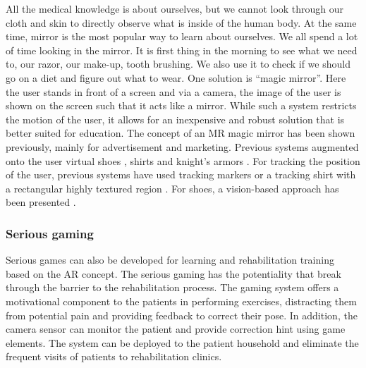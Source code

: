 All the medical knowledge is about ourselves, but we cannot look through our cloth and skin to directly observe what is inside of the human body.  At the same time, mirror is the most popular way to learn about ourselves. We all spend a lot of time looking in the mirror. It is first thing in the morning to see what we need to, our razor, our make-up, tooth brushing. We also use it to check if we should go on a diet and figure out what to wear. 
One solution is ``magic mirror''. Here the user stands in front of a screen and via a camera, the image of the user is shown on the screen such that it acts like a mirror. 
While such a system restricts the motion of the user, it allows for an inexpensive and robust solution that is better suited for education. The concept of an MR magic mirror has been shown previously, mainly for advertisement and marketing. Previous systems augmented onto the user virtual shoes \cite{Eisert2008,Luh2013} , shirts \cite{Ehara2006} and knight's armors \cite{Fiala2007}. For tracking the position of the user, previous systems have used tracking markers  or a tracking shirt with a rectangular highly textured region \cite{Hilsmann2008}. For shoes, a vision-based approach has been presented \cite{Eisert2008}.

\subsubsection{Serious gaming}
Serious games can also be developed for learning and rehabilitation training based on the AR concept.
The serious gaming has the potentiality that break through the barrier to the rehabilitation process. The gaming system offers a motivational component to the patients in performing exercises, distracting them from potential pain and providing feedback to correct their pose. In addition, the camera sensor can monitor the patient and provide correction hint using game elements. The system can be deployed to the patient household and eliminate the frequent visits of patients to rehabilitation clinics.

